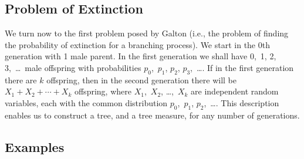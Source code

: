\subsection*{Problem of Extinction}
We turn now to the first problem posed by Galton (i.e., the problem of finding
the probability of extinction for a branching process).  We start in the
0th generation with 1 male parent.  In the first generation we shall have 0,~1,
2, 3,~\ldots\ male offspring with probabilities $p_0$,~$p_1$, $p_2$,
$p_3$,~\ldots.  If in the first generation there are $k$ offspring, then in the
second generation there will be $X_1 + X_2 +\cdots+ X_k$ offspring, where
$X_1$,~$X_2$, \ldots,~$X_k$ are independent random variables, each with the
common distribution $p_0$,~$p_1$, $p_2$,~\ldots.  This description enables us to
construct a tree, and a tree measure, for any number of generations.

\subsection*{Examples}

